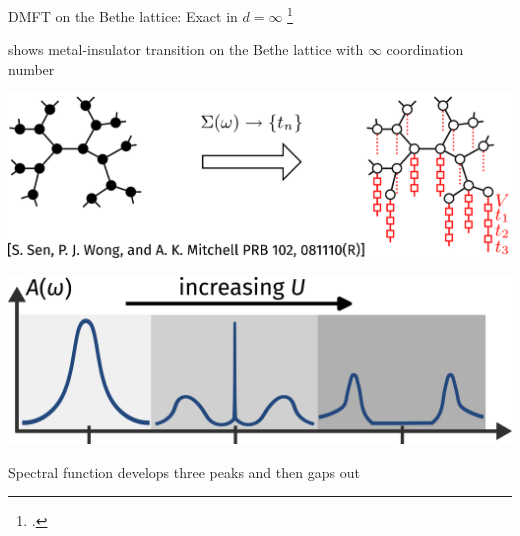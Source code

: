 \documentclass[8pt,aspectratio=169]{beamer}
\newcommand{\nitem}{\item[\ding{51}]}
\begin{document}
\begin{frame}{DMFT on the Bethe lattice: Exact in \(d=\infty\)}
\footcite{metzner_volhardt_1989,kotliar1996,parcollet_2004,maier_2005,kotliar_rmp_2006,ohashi_2008,held_2013,sen_2020}

\begin{itemize}
\begin{minipage}{0.4\textwidth}
\nitem shows \alert{metal-insulator transition} on the Bethe lattice with \(\infty\) coordination number
\end{minipage}
\hspace*{\fill}
\begin{minipage}{0.45\textwidth}
\includegraphics[width=\textwidth]{bethe-lattice.pdf}
\end{minipage}

\vspace*{\fill}

\begin{minipage}{0.45\textwidth}
\includegraphics[width=\textwidth]{dmft-sf.pdf}
\end{minipage}
\hspace*{\fill}
\begin{minipage}{0.4\textwidth}
\nitem Spectral function develops three peaks and then \alert{gaps out}
\end{minipage}

\vspace*{\fill}


\end{itemize}
\end{frame}
\end{document}
